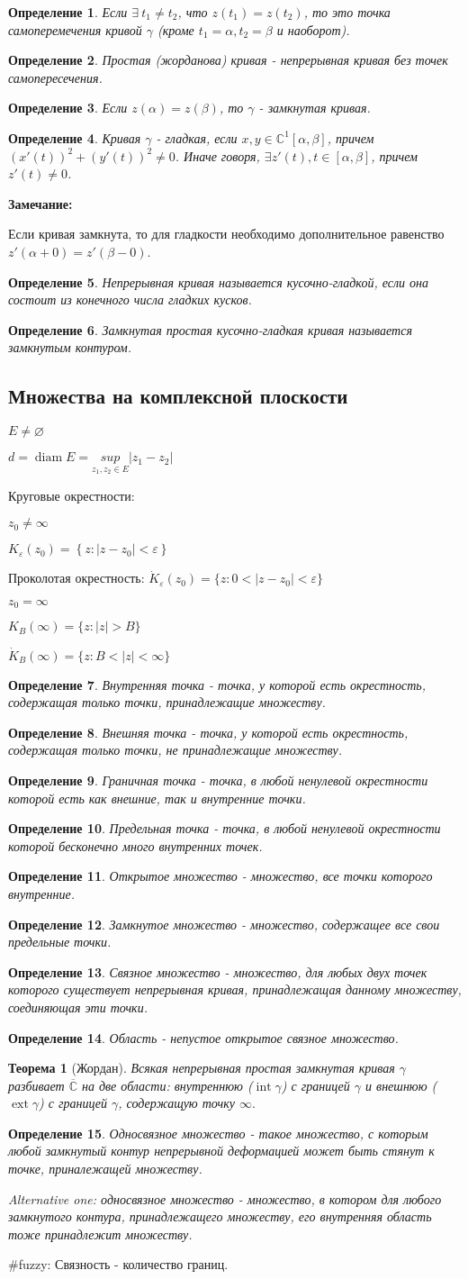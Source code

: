 \documentclass[draft]{report}
\renewcommand{\C}{\mathbb{C}}
\renewcommand{\bar}{\overline}
\newcommand{\diam}{\mathop{\mathrm{diam}}\nolimits}
\newcommand{\Int}{\mathop{\mathrm{int}}\nolimits}
\newcommand{\Ext}{\mathop{\mathrm{ext}}\nolimits}
\renewcommand{\a}{\alpha}
\renewcommand{\b}{\beta}
\newcommand{\g}{\gamma}
\newcommand{\opr}[1]{\begin{opred}#1\end{opred}}
\newtheorem*{theor}{Теорема}
\newtheorem*{opred}{Определение}
\theoremstyle{remark}
\begin{document}
\opr{Если $\exists\ t_1\neq t_2$, что $z(t_1)=z(t_2)$, то это точка самоперемечения кривой $\gamma$ (кроме $t_1=\alpha,t_2=\beta$ и наоборот).}
\opr{Простая (жорданова) кривая - непрерывная кривая без точек самопересечения.}
\opr{Если $z(\alpha)=z(\beta)$, то $\gamma$ - замкнутая кривая.}
\opr{Кривая $\g$ - гладкая, если $x,y\in\C^1[\a,\b]$, причем $(x'(t))^2+(y'(t))^2\neq0$. Иначе говоря, $\exists z'(t), t\in[\a,\b]$, причем $z'(t)\neq0$.}
{\bfseries Замечание:}

Если кривая замкнута, то для гладкости необходимо дополнительное равенство $z'(\a+0)=z'(\b-0)$.

\opr{Непрерывная кривая называется кусочно-гладкой, если она состоит из конечного числа гладких кусков.}
\opr{Замкнутая простая кусочно-гладкая кривая называется замкнутым контуром.}

\subsection{Множества на комплексной плоскости}

$E\neq\varnothing$

$d=\diam E=\underset{z_1,z_2\in E}{sup}|z_1-z_2|$

Круговые окрестности:

$z_0\neq\infty$

$K_\varepsilon(z_0)=\left\{z\colon|z-z_0|<\varepsilon\right\}$

Проколотая окрестность: $\dot{K}_\varepsilon(z_0)=\bigl\{z\colon0<|z-z_0|<\varepsilon\bigr\}$

$z_0=\infty$

$K_B(\infty)=\bigl\{z\colon|z|>B\bigr\}$

$\dot{K}_B(\infty)=\bigl\{z\colon B<|z|<\infty\bigr\}$

\opr{Внутренняя точка - точка, у которой есть окрестность, содержащая только точки, принадлежащие множеству.}
\opr{Внешняя точка - точка, у которой есть окрестность, содержащая только точки, не принадлежащие множеству.}
\opr{Граничная точка - точка, в любой ненулевой окрестности которой есть как внешние, так и внутренние точки.}
\opr{Предельная точка - точка, в любой ненулевой окрестности которой бесконечно много внутренних точек.}
\opr{Открытое множество - множество, все точки которого внутренние.}
\opr{Замкнутое множество - множество, содержащее все свои предельные точки.}
\opr{Связное множество - множество, для любых двух точек которого существует непрерывная кривая, принадлежащая данному множеству, соединяющая эти точки.}
\opr{Область - непустое открытое связное множество.}
\begin{theor}[Жордан]
Всякая непрерывная простая замкнутая кривая $\g$ разбивает $\bar{\C}$ на две области: внутреннюю ($\Int\g$) с границей $\g$ и внешнюю ($\Ext\g$) с границей $\g$, содержащую точку $\infty.$
\end{theor}
\opr{Односвязное множество - такое множество, с которым любой замкнутый контур непрерывной деформацией может быть стянут к точке, приналежащей множеству.

Alternative one: односвязное множество - множество, в котором для любого замкнутого контура, принадлежащего множеству, его внутренняя область тоже принадлежит множеству.}
\#fuzzy: Связность - количество границ.
\end{document}
